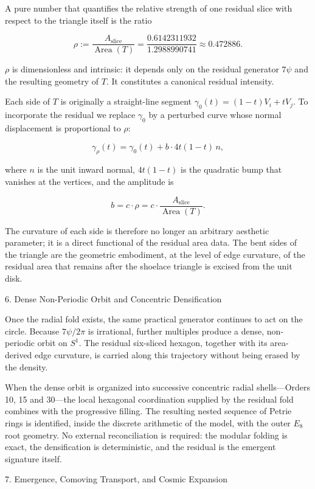 A pure number that quantifies the relative strength of one residual slice with respect to the triangle itself is the ratio

\[
\rho := \frac{A_{\mathrm{slice}}}{\operatorname{Area}(T)}
= \frac{0.6142311932}{1.2988990741}
\approx 0.472886.
\]

\(\rho\) is dimensionless and intrinsic: it depends only on the residual generator \(7\psi\) and the resulting geometry of \(T\). It constitutes a canonical residual intensity.

Each side of \(T\) is originally a straight-line segment \(\gamma_0(t)=(1-t)V_i+tV_j\). To incorporate the residual we replace \(\gamma_0\) by a perturbed curve whose normal displacement is proportional to \(\rho\):

\[
\gamma_\rho(t)=\gamma_0(t)+b\cdot 4t(1-t)\,n,
\]

where \(n\) is the unit inward normal, \(4t(1-t)\) is the quadratic bump that vanishes at the vertices, and the amplitude is

\[
b=c\cdot\rho=c\cdot\frac{A_{\mathrm{slice}}}{\operatorname{Area}(T)}.
\]

The curvature of each side is therefore no longer an arbitrary aesthetic parameter; it is a direct functional of the residual area data. The bent sides of the triangle are the geometric embodiment, at the level of edge curvature, of the residual area that remains after the shoelace triangle is excised from the unit disk.

6. Dense Non-Periodic Orbit and Concentric Densification

Once the radial fold exists, the same practical generator continues to act on the circle. Because \(7\psi/2\pi\) is irrational, further multiples produce a dense, non-periodic orbit on \(S^1\). The residual six-sliced hexagon, together with its area-derived edge curvature, is carried along this trajectory without being erased by the density.

When the dense orbit is organized into successive concentric radial shells—Orders 10, 15 and 30—the local hexagonal coordination supplied by the residual fold combines with the progressive filling. The resulting nested sequence of Petrie rings is identified, inside the discrete arithmetic of the model, with the outer \(E_8\) root geometry. No external reconciliation is required: the modular folding is exact, the densification is deterministic, and the residual is the emergent signature itself.

7. Emergence, Comoving Transport, and Cosmic Expansion

